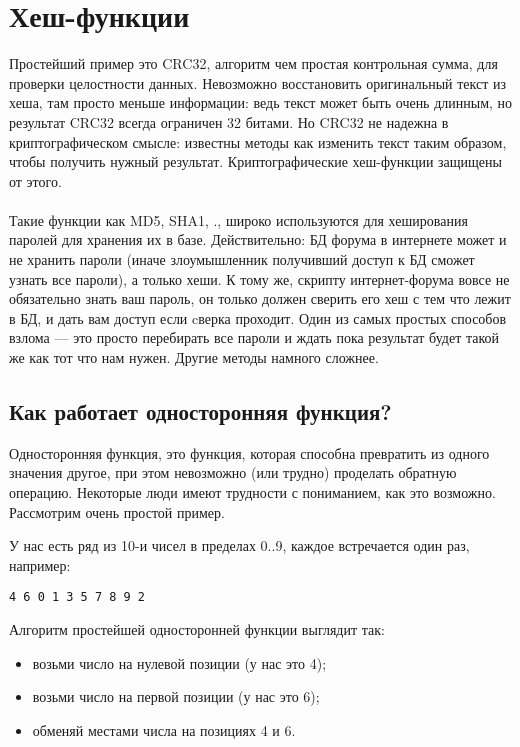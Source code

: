 ﻿\ifdefined\RUSSIAN
\newcommand{\HashFuncChapterName}{Хеш-функции}
\section{\HashFuncChapterName}
\label{hash_func}

\myindex{\HashFuncChapterName}
Простейший пример это CRC32, алгоритм  чем простая контрольная сумма,
для проверки целостности данных.
Невозможно восстановить оригинальный текст из хеша, там просто меньше информации: ведь текст
может быть очень длинным, но результат CRC32 всегда ограничен 32 битами.
Но CRC32 не надежна в криптографическом смысле: известны методы как изменить текст таким образом,
чтобы получить нужный результат.
Криптографические хеш-функции защищены от этого. \\
\\
Такие функции как MD5, SHA1, \etc{}., широко используются для хеширования паролей
для хранения их в базе.
Действительно: БД форума в интернете может и не хранить пароли 
(иначе злоумышленник получивший доступ к БД сможет узнать все пароли), а только хеши.
К тому же, скрипту интернет-форума вовсе не обязательно знать ваш пароль, он только должен
сверить его хеш с тем что лежит в БД, и дать вам доступ если cверка проходит.
Один из самых простых способов взлома --- это просто перебирать все пароли и ждать пока
результат будет такой же как тот что нам нужен.
Другие методы намного сложнее.

\subsection{Как работает односторонняя функция?}

Односторонняя функция, это функция, которая способна превратить из одного значения другое,
при этом невозможно (или трудно) проделать обратную операцию.
Некоторые люди имеют трудности с пониманием, как это возможно.
Рассмотрим очень простой пример.

У нас есть ряд из 10-и чисел в пределах 0..9, каждое встречается один раз, например:

\begin{lstlisting}
4 6 0 1 3 5 7 8 9 2
\end{lstlisting}

Алгоритм простейшей односторонней функции выглядит так:

\begin{itemize}
\item возьми число на нулевой позиции (у нас это 4);
\item возьми число на первой позиции (у нас это 6);
\item обменяй местами числа на позициях 4 и 6.
\end{itemize}

